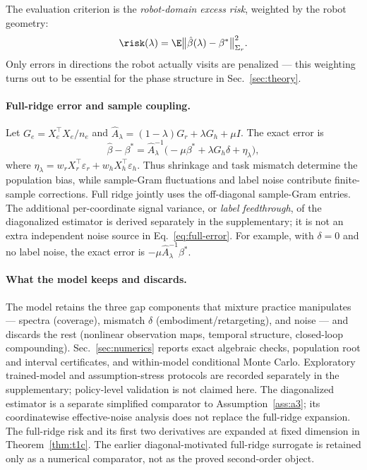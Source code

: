 The evaluation criterion is the \emph{robot-domain excess risk}, weighted by the robot geometry:
\begin{equation}
  \risk(\lambda) = \E\big\| \hat\beta(\lambda) - \beta^* \big\|^2_{\Sigma_r}.
  \label{eq:risk}
\end{equation}
Only errors in directions the robot actually visits are penalized --- this weighting turns out to be essential for the phase structure in Sec.~\ref{sec:theory}.

\paragraph{Full-ridge error and sample coupling.}
Let $G_e=X_e^\top X_e/n_e$ and $\widehat A_\lambda=(1-\lambda)G_r+\lambda G_h+\mu I$. The exact error is
\begin{equation}
 \hat\beta-\beta^*=\widehat A_\lambda^{-1}
 \big(-\mu\beta^*+\lambda G_h\delta+\eta_\lambda\big),
 \label{eq:full-error}
\end{equation}
where $\eta_\lambda=w_rX_r^\top\varepsilon_r+w_hX_h^\top\varepsilon_h$. Thus shrinkage and task mismatch determine the population bias, while sample-Gram fluctuations and label noise contribute finite-sample corrections. Full ridge jointly uses the off-diagonal sample-Gram entries. The additional per-coordinate signal variance, or \emph{label feedthrough}, of the diagonalized estimator is derived separately in the supplementary; it is not an extra independent noise source in Eq.~\eqref{eq:full-error}. For example, with $\delta=0$ and no label noise, the exact error is $-\mu\widehat A_\lambda^{-1}\beta^*$.

\paragraph{What the model keeps and discards.}
The model retains the three gap components that mixture practice manipulates --- spectra (coverage), mismatch $\delta$ (embodiment/retargeting), and noise --- and discards the rest (nonlinear observation maps, temporal structure, closed-loop compounding).
Sec.~\ref{sec:numerics} reports exact algebraic checks, population root and interval certificates, and within-model conditional Monte Carlo. Exploratory trained-model and assumption-stress protocols are recorded separately in the supplementary; policy-level validation is not claimed here.
The diagonalized estimator is a separate simplified comparator to Assumption~\ref{ass:a3}; its coordinatewise effective-noise analysis does not replace the full-ridge expansion. The full-ridge risk and its first two derivatives are expanded at fixed dimension in Theorem~\ref{thm:t1c}. The earlier diagonal-motivated full-ridge surrogate is retained only as a numerical comparator, not as the proved second-order object.
